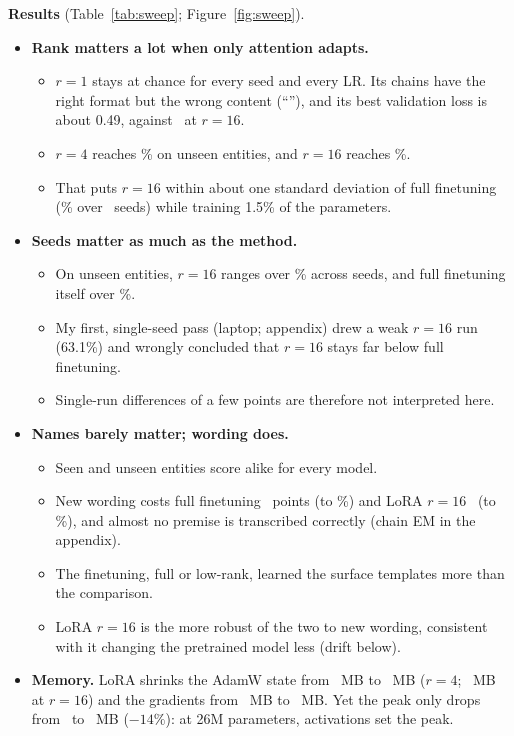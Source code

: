 \textbf{Results} (Table~\ref{tab:sweep}; Figure~\ref{fig:sweep}).
\begin{itemize}[leftmargin=*,nosep]
\item \textbf{Rank matters a lot when only attention adapts.}
\begin{itemize}[leftmargin=*,nosep]
\item $r=1$ stays at chance for every seed and every LR. Its chains have the right format but the wrong content (``''), and its best validation loss is about 0.49, against \AdaLossSixteen\ at $r=16$.
\item $r=4$ reaches \AdaAccFourUnEnt\% on unseen entities, and $r=16$ reaches \AdaAccSixteenUnEnt\%.
\item That puts $r=16$ within about one standard deviation of full finetuning (\FullSeedsUnEnt\% over \FullSeedsN\ seeds) while training 1.5\% of the parameters.
\end{itemize}
\item \textbf{Seeds matter as much as the method.}
\begin{itemize}[leftmargin=*,nosep]
\item On unseen entities, $r=16$ ranges over \SixteenRangeUnEnt\% across seeds, and full finetuning itself over \FullSeedsRangeUnEnt\%.
\item My first, single-seed pass (laptop; appendix) drew a weak $r=16$ run (63.1\%) and wrongly concluded that $r=16$ stays far below full finetuning.
\item Single-run differences of a few points are therefore not interpreted here.
\end{itemize}
\item \textbf{Names barely matter; wording does.}
\begin{itemize}[leftmargin=*,nosep]
\item Seen and unseen entities score alike for every model.
\item New wording costs full finetuning \FullSeedsWordDrop\ points (to \FullSeedsUnWord\%) and LoRA $r=16$ \SixteenWordDrop\ (to \AdaAccSixteenUnWord\%), and almost no premise is transcribed correctly (chain EM in the appendix).
\item The finetuning, full or low-rank, learned the surface templates more than the comparison.
\item LoRA $r=16$ is the more robust of the two to new wording, consistent with it changing the pretrained model less (drift below).
\end{itemize}
\item \textbf{Memory.} LoRA shrinks the AdamW state from \MemOptFull\ MB to \MemOptLoraFour\ MB ($r=4$; \MemOptLoraSixteen\ MB at $r=16$) and the gradients from \MemGradFull\ MB to \MemGradLoraFour\ MB. Yet the peak only drops from \MemPeakFull\ to \MemPeakLoraFour\ MB ($-14\%$): at 26M parameters, activations set the peak.

\end{itemize}
